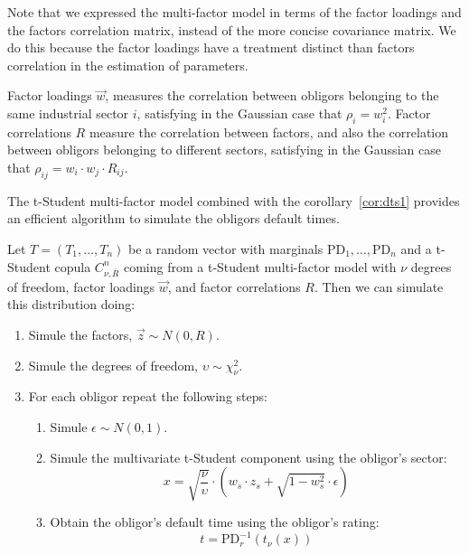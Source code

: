 \documentclass[11pt,fleqn]{book} %
\begin{document}
Note that we expressed the multi-factor model in terms of the factor 
loadings and the factors correlation matrix, instead of the more concise 
covariance matrix. We do this because the factor loadings have a treatment 
distinct than factors correlation in the estimation of parameters.

Factor loadings $\vec{w}$, measures the correlation between obligors 
belonging to the same industrial sector $i$, satisfying in the Gaussian case 
that $\rho_i = w_i^2$. Factor correlations $R$ measure the correlation 
between factors, and also the correlation between obligors belonging to 
different sectors, satisfying in the Gaussian case that 
$\rho_{ij} = w_i \cdot w_j \cdot R_{ij}$.

The t-Student multi-factor model combined with the corollary~\ref{cor:dts1} 
provides an efficient algorithm to simulate the obligors default times.

\begin{corollary}
	\label{cor:dts2}
	Let $T=(T_1, \dots, T_n)$ be a random vector with marginals 
	$\text{PD}_1, \dots, \text{PD}_n$ and a t-Student copula $C_{\nu,\bar{R}}^n$
	coming from a t-Student multi-factor model with $\nu$ degrees of freedom, 
	factor loadings $\vec{w}$, and factor correlations $R$. Then we can simulate 
	this distribution doing:
	\begin{enumerate}
		\item Simule the factors, $\vec{z} \sim N(0,R)$.
		\item Simule the degrees of freedom, $\upsilon \sim \chi_{\nu}^2$.
		\item For each obligor repeat the following steps:
		\begin{enumerate}
			\item Simule $\epsilon \sim N(0,1)$.
			\item Simule the multivariate t-Student component using the obligor's sector:
			\begin{displaymath}
				x = \sqrt{\frac{\nu}{\upsilon}} \cdot \left( w_s \cdot z_s + \sqrt{1-w_s^2} \cdot \epsilon \right)
			\end{displaymath}
			\item Obtain the obligor's default time using the obligor's rating:
			\begin{displaymath}
				t = \text{PD}_r^{-1}\left(t_{\nu}(x)\right)
			\end{displaymath}
		\end{enumerate}
	\end{enumerate}
\end{corollary}
\end{document}
